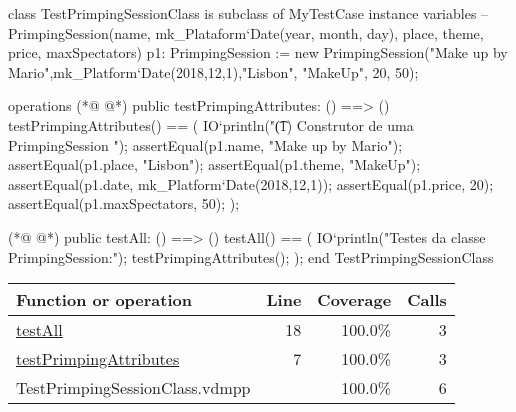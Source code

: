 \begin{vdmpp}[breaklines=true]
class TestPrimpingSessionClass is subclass of MyTestCase
instance variables
 -- PrimpingSession(name, mk_Plataform`Date(year, month, day), place, theme, price, maxSpectators)
 p1: PrimpingSession := new PrimpingSession("Make up by Mario",mk_Platform`Date(2018,12,1),"Lisbon", "MakeUp", 20, 50);
  
operations
(*@
\label{testPrimpingAttributes:7}
@*)
 public testPrimpingAttributes: () ==> ()
 testPrimpingAttributes() == (
 IO`println("\t (1) Construtor de uma PrimpingSession ");
  assertEqual(p1.name, "Make up by Mario");
  assertEqual(p1.place, "Lisbon");
  assertEqual(p1.theme, "MakeUp");
  assertEqual(p1.date, mk_Platform`Date(2018,12,1));
  assertEqual(p1.price, 20);
  assertEqual(p1.maxSpectators, 50);
 );
  
(*@
\label{testAll:18}
@*)
 public testAll: () ==> ()
 testAll() == (
 IO`println("Testes da classe PrimpingSession:");
  testPrimpingAttributes();
 );
end TestPrimpingSessionClass
\end{vdmpp}
\bigskip
\begin{longtable}{|l|r|r|r|}
\hline
Function or operation & Line & Coverage & Calls \\
\hline
\hline
\hyperref[testAll:18]{testAll} & 18&100.0\% & 3 \\
\hline
\hyperref[testPrimpingAttributes:7]{testPrimpingAttributes} & 7&100.0\% & 3 \\
\hline
\hline
TestPrimpingSessionClass.vdmpp & & 100.0\% & 6 \\
\hline
\end{longtable}

